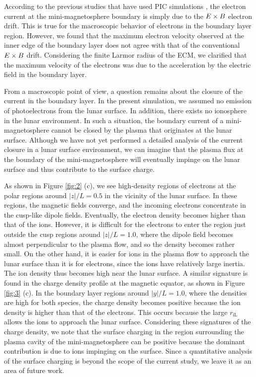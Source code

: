 \documentclass[draft,jgrga]{agutex2015}
\begin{document}
\begin{article}
According to the previous studies that have used PIC simulations \citep[e.g.,][]{Deca2014},
the electron current at the mini-magnetosphere boundary is 
simply due to 
the $\mbox{\boldmath $E$} \times \mbox{\boldmath $B$}$ electron drift.
This is true for the macroscopic behavior of electrons in the boundary layer region.
However, 
we found that 
the maximum electron velocity observed at the inner edge of the boundary layer
does not agree with that of the conventional 
$\mbox{\boldmath $E$} \times \mbox{\boldmath $B$}$ drift.
Considering the finite Larmor radius of the ECM, 
we clarified that the maximum velocity of the electrons was 
due to 
the acceleration by the electric field in the boundary layer.

From a macroscopic point of view, 
a question remains about the closure of the current in the boundary layer.
In the present simulation, 
we assumed no emission of photoelectrons from the lunar surface.
In addition, there exists no ionosphere in the lunar environment.
In such a situation, 
the boundary current of a mini-magnetosphere 
cannot be closed by the plasma that originates at the lunar surface.
Although we have not yet performed a detailed analysis of the current closure in a
lunar surface environment, 
we can imagine that the plasma flux 
at the boundary of the mini-magnetosphere
will eventually impinge on the lunar surface and thus
contribute to the surface charge.

As shown in Figure \ref{fig:2} (c),
we see high-density regions of electrons
at the polar regions around $|z|/L =0.5$ in
the vicinity of the lunar surface.
In these regions,
the magnetic fields converge, and the incoming electrons concentrate
in the cusp-like dipole fields.
Eventually, the electron density becomes higher than that of the ions.
However, it is difficult for the electrons to enter the region
just outside the cusp regions around $|z|/L = 1.0$,
where the dipole field becomes 
almost perpendicular to the plasma flow, 
and so
the density becomes rather small.  
On the other hand, it is easier for
ions in the plasma flow to approach the lunar surface
than it is for electrons, since the ions have relatively large inertia.
The ion density thus becomes high near the lunar surface.
A similar signature 
is found in the charge density profile at the magnetic equator, as shown in Figure \ref{fig:3} (c).
In the boundary layer regions around $|y|/L = 1.0$, where the densities are high 
for both species,
the charge density becomes positive 
because the ion density is higher than that of the electrons.
This occurs because the large $r_\mathrm{iL}$ allows the ions to approach the lunar surface.
Considering these signatures of the charge density, we note that 
the surface charging in the region surrounding the plasma cavity 
of the mini-magnetosphere can be positive
because the dominant contribution is due to ions impinging on the surface.
Since a quantitative analysis of the surface charging is 
beyond the scope of the current study, 
we leave it as an area of future work.


\end{article}
\end{document}
